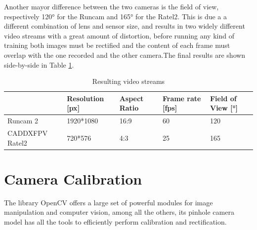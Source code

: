 Another mayor difference between the two cameras is the field of view, respectively 120° for the Runcam and 165° for the Ratel2. This is due a a different combination of lens and sensor size, and results in two widely different video streams with a great amount of distortion, before running any kind of training both images must be rectified and the content of each frame must overlap with the one recorded and the other camera.The final results are shown side-by-side in Table \ref{tab:cam_table}.






\begin{table}[h]
\centering
\caption{Resulting video streams}
\label{tab:cam_table}
\begin{tabular}{l|l|l|l|l|}
  \cline{2-5}
                                        & \cellcolor[HTML]{C0C0C0}Resolution {[}px{]} & \cellcolor[HTML]{C0C0C0}Aspect Ratio & \cellcolor[HTML]{C0C0C0}Frame rate {[}fps{]} & \cellcolor[HTML]{C0C0C0}Field of View {[}°{]} \\ \hline
  \multicolumn{1}{|l|}{Runcam 2}        & 1920*1080                                   & 16:9                                 & 60                                           & 120                                           \\ \hline
  \multicolumn{1}{|l|}{CADDXFPV Ratel2} & 720*576                                     & 4:3                                  & 25                                           & 165                                           \\ \hline
  \end{tabular}
\end{table}





\section {Camera Calibration}
\label{sec:camera_calib}

The library OpenCV\cite{opencv} offers a large set of powerful modules for image manipulation and computer vision, among all the others, its pinhole camera model has all the tools to efficiently perform calibration and rectification.

